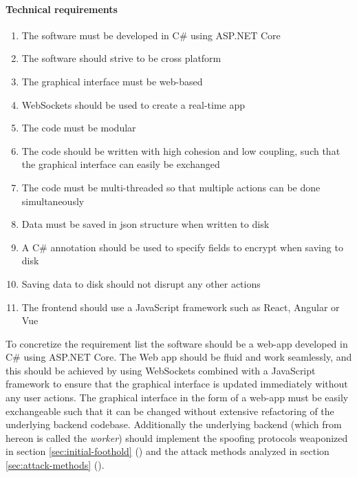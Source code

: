 \documentclass{article}
\begin{document}
\paragraph{Technical requirements}
\begin{enumerate}
    \item The software must be developed in C\# using ASP.NET Core
    \item The software should strive to be cross platform
    \item The graphical interface must be web-based
    \item WebSockets should be used to create a real-time app
    \item The code must be modular
    \item The code should be written with high cohesion and low coupling, such that the graphical interface can easily be exchanged
    \item The code must be multi-threaded so that multiple actions can be done simultaneously
    \item Data must be saved in \gls{json} structure when written to disk
    \item A C\# annotation should be used to specify fields to encrypt when saving to disk
    \item Saving data to disk should not disrupt any other actions
    \item The frontend should use a JavaScript framework such as React, Angular or Vue
\end{enumerate}

To concretize the requirement list the software should be a web-app developed in C\# using ASP.NET Core. The Web app should be fluid and work seamlessly, and this should be achieved by using WebSockets combined with a JavaScript framework to ensure that the graphical interface is updated immediately without any user actions. The graphical interface in the form of a web-app must be easily exchangeable such that it can be changed without extensive refactoring of the underlying backend codebase. Additionally the underlying backend (which from hereon is called the \emph{worker}) should implement the spoofing protocols weaponized in section \ref{sec:initial-foothold} () and the attack methods analyzed in section \ref{sec:attack-methods} ().
\end{document}

